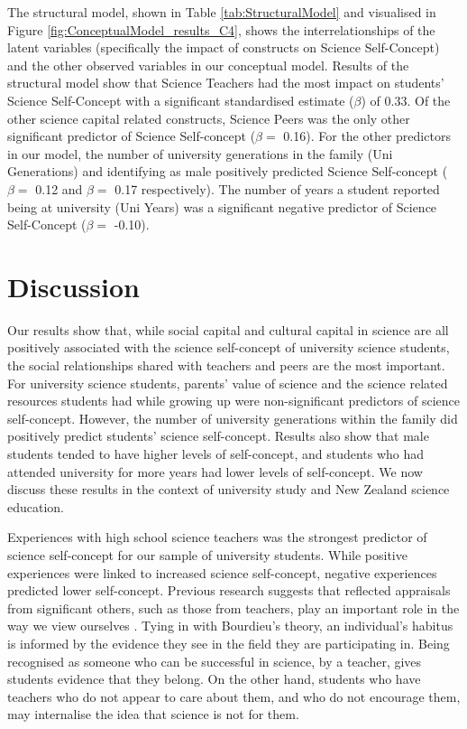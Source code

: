 The structural model, shown in Table \ref{tab:StructuralModel} and visualised in Figure \ref{fig:ConceptualModel_results_C4}, shows the interrelationships of the latent variables (specifically the impact of constructs on Science Self-Concept) and the other observed variables in our conceptual model. Results of the structural model show that Science Teachers had the most impact on students' Science Self-Concept with a significant standardised estimate ($\beta$) of 0.33. Of the other science capital related constructs, Science Peers was the only other significant predictor of Science Self-concept ($\beta =$ 0.16). For the other predictors in our model, the number of university generations in the family (Uni Generations) and identifying as male positively predicted Science Self-concept ($\beta =$ 0.12 and $\beta =$ 0.17 respectively). The number of years a student reported being at university (Uni Years) was a significant negative predictor of Science Self-Concept ($\beta =$ -0.10). 

\section*{Discussion}
\label{discussion}
Our results show that, while social capital and cultural capital in science are all positively associated with the science self-concept of university science students, the social relationships shared with teachers and peers are the most important. For university science students, parents' value of science and the science related resources students had while growing up were non-significant predictors of science self-concept. However, the number of university generations within the family did positively predict students' science self-concept. Results also show that male students tended to have higher levels of self-concept, and students who had attended university for more years had lower levels of self-concept. We now discuss these results in the context of university study and New Zealand science education.

Experiences with high school science teachers was the strongest predictor of science self-concept for our sample of university students. While positive experiences were linked to increased science self-concept, negative experiences predicted lower self-concept. Previous research suggests that reflected appraisals from significant others, such as those from teachers, play an important role in the way we view ourselves \citep{bong2003academic}. Tying in with Bourdieu's theory, an individual's habitus is informed by the evidence they see in the field they are participating in. Being recognised as someone who can be successful in science, by a teacher, gives students evidence that they belong. On the other hand, students who have teachers who do not appear to care about them, and who do not encourage them, may internalise the idea that science is not for them. 

